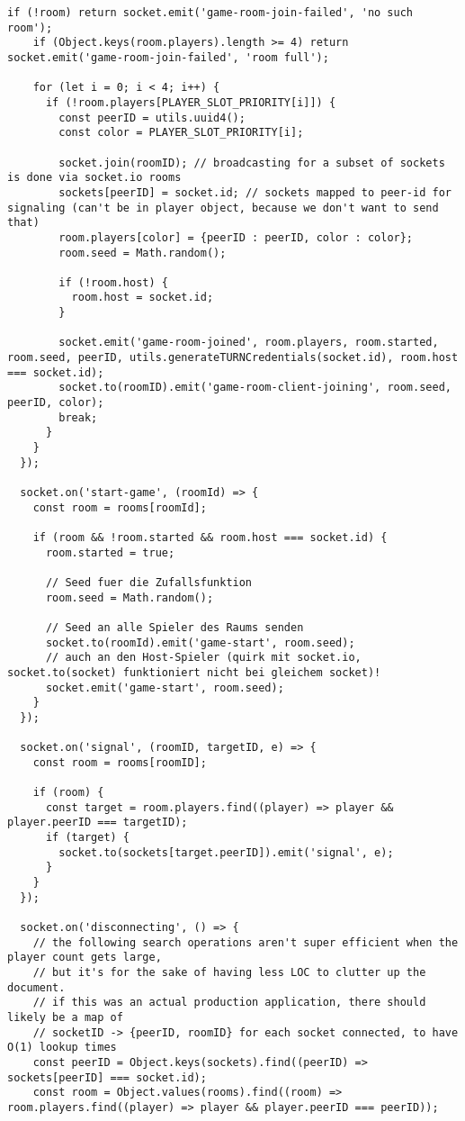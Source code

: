 \begin{singlespace}
\begin{lstlisting}[]
    if (!room) return socket.emit('game-room-join-failed', 'no such room');
    if (Object.keys(room.players).length >= 4) return socket.emit('game-room-join-failed', 'room full');

    for (let i = 0; i < 4; i++) {
      if (!room.players[PLAYER_SLOT_PRIORITY[i]]) {
        const peerID = utils.uuid4();
        const color = PLAYER_SLOT_PRIORITY[i];

        socket.join(roomID); // broadcasting for a subset of sockets is done via socket.io rooms
        sockets[peerID] = socket.id; // sockets mapped to peer-id for signaling (can't be in player object, because we don't want to send that)
        room.players[color] = {peerID : peerID, color : color};
        room.seed = Math.random();

        if (!room.host) {
          room.host = socket.id;
        }

        socket.emit('game-room-joined', room.players, room.started, room.seed, peerID, utils.generateTURNCredentials(socket.id), room.host === socket.id);
        socket.to(roomID).emit('game-room-client-joining', room.seed, peerID, color);
        break;
      }
    }
  });

  socket.on('start-game', (roomId) => {
    const room = rooms[roomId];

    if (room && !room.started && room.host === socket.id) {
      room.started = true;

      // Seed fuer die Zufallsfunktion
      room.seed = Math.random();

      // Seed an alle Spieler des Raums senden
      socket.to(roomId).emit('game-start', room.seed);
      // auch an den Host-Spieler (quirk mit socket.io, socket.to(socket) funktioniert nicht bei gleichem socket)!
      socket.emit('game-start', room.seed);
    }
  });

  socket.on('signal', (roomID, targetID, e) => {
    const room = rooms[roomID];

    if (room) {
      const target = room.players.find((player) => player && player.peerID === targetID);
      if (target) {
        socket.to(sockets[target.peerID]).emit('signal', e);
      }
    }
  });

  socket.on('disconnecting', () => {
    // the following search operations aren't super efficient when the player count gets large,
    // but it's for the sake of having less LOC to clutter up the document.
    // if this was an actual production application, there should likely be a map of
    // socketID -> {peerID, roomID} for each socket connected, to have O(1) lookup times
    const peerID = Object.keys(sockets).find((peerID) => sockets[peerID] === socket.id);
    const room = Object.values(rooms).find((room) => room.players.find((player) => player && player.peerID === peerID));


\end{lstlisting}
\end{singlespace}
